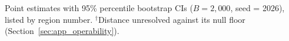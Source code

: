 \documentclass[AMA,Times1COL]{WileyNJDv5}
\begin{document}
\begin{table}[ht]
\centering
\caption{Per-effect-modifier Wasserstein-1 distance $\widehat{W}_1$ in original variable units (years for age, mmHg for SBP) with 95\% percentile bootstrap CIs for Region~8 versus each partner region (GUSTO-I), listed by region number.\label{tab:gusto_nabcd}}
\begin{tablenotes}
\item Point estimates with 95\% percentile bootstrap CIs ($B = 2{,}000$, seed = 2026), listed by region number. $^\dagger$Distance unresolved against its null floor (Section~\ref{sec:app_operability}).%
\end{tablenotes}
\end{table}


\end{document}
